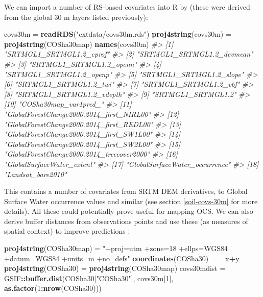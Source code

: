 \documentclass[graybox,natbib,nospthms,UStrade]{svmono}
\newenvironment{Shaded}{\begin{snugshade}}{\end{snugshade}}
\newcommand{\CommentTok}[1]{\textcolor[rgb]{0.37,0.37,0.37}{\textit{#1}}}
\newcommand{\DecValTok}[1]{\textcolor[rgb]{0.06,0.06,0.06}{#1}}
\newcommand{\ErrorTok}[1]{\textcolor[rgb]{0.14,0.14,0.14}{\textbf{#1}}}
\newcommand{\KeywordTok}[1]{\textcolor[rgb]{0.27,0.27,0.27}{\textbf{#1}}}
\newcommand{\NormalTok}[1]{#1}
\newcommand{\OperatorTok}[1]{\textcolor[rgb]{0.43,0.43,0.43}{\textbf{#1}}}
\newcommand{\StringTok}[1]{\textcolor[rgb]{0.5,0.5,0.5}{#1}}
\begin{document}
We can import a number of RS-based covariates into R by (these were derived from the global 30 m layers listed previously):

\begin{Shaded}
\begin{Highlighting}[]
\NormalTok{covs30m =}\StringTok{ }\KeywordTok{readRDS}\NormalTok{(}\StringTok{"extdata/covs30m.rds"}\NormalTok{)}
\KeywordTok{proj4string}\NormalTok{(covs30m) =}\StringTok{ }\KeywordTok{proj4string}\NormalTok{(COSha30map)}
\KeywordTok{names}\NormalTok{(covs30m)}
\CommentTok{#>  [1] "SRTMGL1_SRTMGL1.2_cprof"                  }
\CommentTok{#>  [2] "SRTMGL1_SRTMGL1.2_devmean"                }
\CommentTok{#>  [3] "SRTMGL1_SRTMGL1.2_openn"                  }
\CommentTok{#>  [4] "SRTMGL1_SRTMGL1.2_openp"                  }
\CommentTok{#>  [5] "SRTMGL1_SRTMGL1.2_slope"                  }
\CommentTok{#>  [6] "SRTMGL1_SRTMGL1.2_twi"                    }
\CommentTok{#>  [7] "SRTMGL1_SRTMGL1.2_vbf"                    }
\CommentTok{#>  [8] "SRTMGL1_SRTMGL1.2_vdepth"                 }
\CommentTok{#>  [9] "SRTMGL1_SRTMGL1.2"                        }
\CommentTok{#> [10] "COSha30map_var1pred_"                     }
\CommentTok{#> [11] "GlobalForestChange2000.2014_first_NIRL00" }
\CommentTok{#> [12] "GlobalForestChange2000.2014_first_REDL00" }
\CommentTok{#> [13] "GlobalForestChange2000.2014_first_SW1L00" }
\CommentTok{#> [14] "GlobalForestChange2000.2014_first_SW2L00" }
\CommentTok{#> [15] "GlobalForestChange2000.2014_treecover2000"}
\CommentTok{#> [16] "GlobalSurfaceWater_extent"                }
\CommentTok{#> [17] "GlobalSurfaceWater_occurrence"            }
\CommentTok{#> [18] "Landsat_bare2010"}
\end{Highlighting}
\end{Shaded}

This contains a number of covariates from SRTM DEM derivatives, to Global Surface Water occurrence values and similar (see section \ref{soil-covs-30m} for more details). All these could potentially prove useful for mapping OCS. We can also derive buffer distances from observations points and use these (as measures of spatial context) to improve predictions \citep{Hengl2018RFsp}:

\begin{Shaded}
\begin{Highlighting}[]
\KeywordTok{proj4string}\NormalTok{(COSha30map) =}\StringTok{ "+proj=utm +zone=18 +ellps=WGS84 +datum=WGS84 +units=m +no_defs"}
\KeywordTok{coordinates}\NormalTok{(COSha30) =}\StringTok{ }\ErrorTok{~}\StringTok{ }\NormalTok{x}\OperatorTok{+}\NormalTok{y}
\KeywordTok{proj4string}\NormalTok{(COSha30) =}\StringTok{ }\KeywordTok{proj4string}\NormalTok{(COSha30map)}
\NormalTok{covs30mdist =}\StringTok{ }\NormalTok{GSIF}\OperatorTok{::}\KeywordTok{buffer.dist}\NormalTok{(COSha30[}\StringTok{"COSha30"}\NormalTok{], covs30m[}\DecValTok{1}\NormalTok{],}
                                \KeywordTok{as.factor}\NormalTok{(}\DecValTok{1}\OperatorTok{:}\KeywordTok{nrow}\NormalTok{(COSha30)))}
\end{Highlighting}
\end{Shaded}
\end{document}
